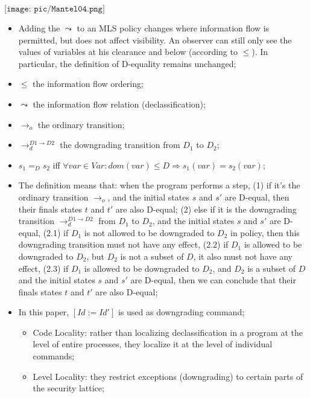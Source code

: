 $\texttt{[image: pic/Mantel04.png]}$
\begin{itemize}
  \item Adding the $\leadsto$ to an MLS policy changes where information flow is
  permitted, but does not affect visibility. An observer can still only see the
  values of variables at his clearance and below (according to $\leq$). In
  particular, the definition of D-equality remains unchanged;
  \item $\leq$ the information flow ordering;
  \item $\leadsto$ the information flow relation (declassification);
  \item $\rightarrow_o$ the ordinary transition;
  \item $\rightarrow^{D1 \rightarrow D2}_d$ the downgrading transition from
  $D_1$ to $D_2$;
  \item $s_1 =_D s_2$ iff $\forall var \in Var: dom(var) \leq D \Rightarrow
  s_1(var) = s_2(var)$;
  \item The definition means that: when the program performs a step, (1) if it's
  the ordinary transition $\rightarrow_o$, and the initial states $s$ and $s'$
  are D-equal, then their finals states $t$ and $t'$ are also D-equal;
  (2) else if it is the downgrading
  transition $\rightarrow^{D1 \rightarrow D2}_d$ from $D_1$ to $D_2$, and the
  initial states $s$ and $s'$ are D-equal, (2.1) if $D_1$ is not allowed to be
  downgraded to $D_2$ in policy, then this downgrading transition must not have
  any effect, (2.2) if $D_1$ is allowed to be downgraded to $D_2$, but $D_2$ is
  not a subset of $D$, it also must not have any effect, (2.3) if $D_1$ is
  allowed to be downgraded to $D_2$, and $D_2$ is a subset of $D$ and the
  initial states $s$ and $s'$ are D-equal, then we can conclude that their
  finals states $t$ and $t'$ are also D-equal;
  \item In this paper, $[Id := Id']$ is used as downgrading command;
  \begin{itemize}
    \item Code Locality: rather than localizing declassification in a program at
    the level of entire processes, they localize it at the level of individual commands;
    \item Level Locality: they restrict exceptions (downgrading) to certain
    parts of the security lattice;
  \end{itemize}
\end{itemize}




















